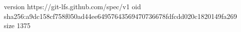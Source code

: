 version https://git-lfs.github.com/spec/v1
oid sha256:a9dc158cf758f050ad44ee64957643569470736678fdfcdd020c1820149fa269
size 1375
